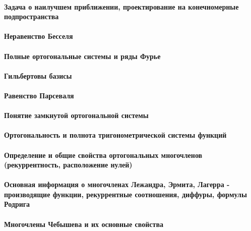 \documentclass[russian,twocolumn]{article}
\begin{document}
\paragraph{Задача о наилучшем приближении, проектирование на конечномерные подпространства}

\paragraph{Неравенство Бесселя}

\paragraph{Полные ортогональные системы и ряды Фурье}

\paragraph{Гильбертовы базисы}

\paragraph{Равенство Парсеваля}

\paragraph{Понятие замкнутой ортогональной системы}

\paragraph{Ортогональность и полнота тригонометрической системы функций}

\paragraph{Определение и общие свойства ортогональных многочленов (рекуррентность, расположение нулей)}

\paragraph{Основная информация о многочленах Лежандра, Эрмита, Лагерра - производящие функции, рекуррентные соотношения, диффуры, формулы Родрига}

\paragraph{Многочлены Чебышева и их основные свойства}
\end{document}
